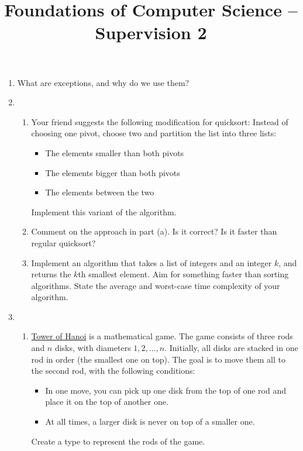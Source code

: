 \documentclass[11pt,a4paper]{article}
\title{Foundations of Computer Science -- Supervision 2}
\author{}
\date{}
\begin{document}
\maketitle


\begin{enumerate}

\item 

What are exceptions, and why do we use them?
\item
\begin{enumerate}
    \item Your friend suggests the following modification for quicksort:  
    Instead of choosing one pivot, choose two and partition the list into three lists:
    \begin{itemize}
        \item The elements smaller than both pivots
        \item The elements bigger than both pivots
        \item The elements between the two
    \end{itemize}
    Implement this variant of the algorithm.

    \item Comment on the approach in part (a). Is it correct? Is it faster than regular quicksort?

    \item Implement an algorithm that takes a list of integers and an integer $k$, and 
    returns the $k$th smallest element. Aim for something faster than sorting 
    algorithms. State the average and worst-case time complexity of your algorithm.
\end{enumerate}

\item
\begin{enumerate}
    \item \href{https://en.wikipedia.org/wiki/Tower_of_Hanoi}{Tower of Hanoi} is a mathematical game.  
    The game consists of three rods and $n$ disks, with diameters $1,2,\dots,n$.  
    Initially, all disks are stacked in one rod in order (the smallest one on top).  
    The goal is to move them all to the second rod, with the following conditions:
    \begin{itemize}
        \item In one move, you can pick up one disk from the top of one rod and place it on the top of another one.
        \item At all times, a larger disk is never on top of a smaller one.
    \end{itemize}
    Create a type to represent the rods of the game.


\end{enumerate}
\end{enumerate}
\end{document}
